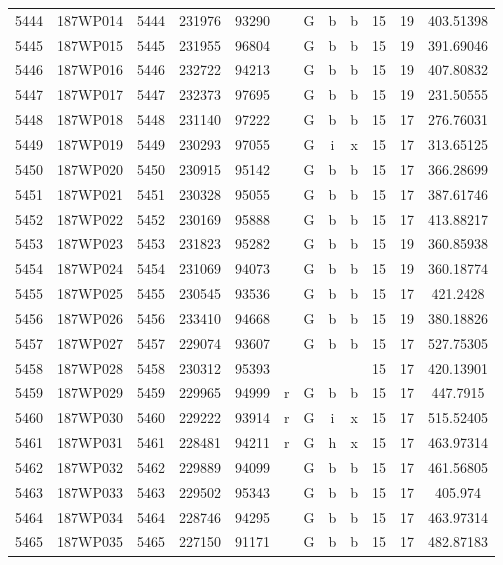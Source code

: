\begin{tabular}{|*{12}{c|}}
5444 & 187WP014 & 5444 & 231976 & 93290 &  & G & b & b & 15 & 19 & 403.51398 \\ 
5445 & 187WP015 & 5445 & 231955 & 96804 &  & G & b & b & 15 & 19 & 391.69046 \\ 
5446 & 187WP016 & 5446 & 232722 & 94213 &  & G & b & b & 15 & 19 & 407.80832 \\ 
5447 & 187WP017 & 5447 & 232373 & 97695 &  & G & b & b & 15 & 19 & 231.50555 \\ 
5448 & 187WP018 & 5448 & 231140 & 97222 &  & G & b & b & 15 & 17 & 276.76031 \\ 
5449 & 187WP019 & 5449 & 230293 & 97055 &  & G & i & x & 15 & 17 & 313.65125 \\ 
5450 & 187WP020 & 5450 & 230915 & 95142 &  & G & b & b & 15 & 17 & 366.28699 \\ 
5451 & 187WP021 & 5451 & 230328 & 95055 &  & G & b & b & 15 & 17 & 387.61746 \\ 
5452 & 187WP022 & 5452 & 230169 & 95888 &  & G & b & b & 15 & 17 & 413.88217 \\ 
5453 & 187WP023 & 5453 & 231823 & 95282 &  & G & b & b & 15 & 19 & 360.85938 \\ 
5454 & 187WP024 & 5454 & 231069 & 94073 &  & G & b & b & 15 & 19 & 360.18774 \\ 
5455 & 187WP025 & 5455 & 230545 & 93536 &  & G & b & b & 15 & 17 & 421.2428 \\ 
5456 & 187WP026 & 5456 & 233410 & 94668 &  & G & b & b & 15 & 19 & 380.18826 \\ 
5457 & 187WP027 & 5457 & 229074 & 93607 &  & G & b & b & 15 & 17 & 527.75305 \\ 
5458 & 187WP028 & 5458 & 230312 & 95393 &  &  &  &  & 15 & 17 & 420.13901 \\ 
5459 & 187WP029 & 5459 & 229965 & 94999 & r & G & b & b & 15 & 17 & 447.7915 \\ 
5460 & 187WP030 & 5460 & 229222 & 93914 & r & G & i & x & 15 & 17 & 515.52405 \\ 
5461 & 187WP031 & 5461 & 228481 & 94211 & r & G & h & x & 15 & 17 & 463.97314 \\ 
5462 & 187WP032 & 5462 & 229889 & 94099 &  & G & b & b & 15 & 17 & 461.56805 \\ 
5463 & 187WP033 & 5463 & 229502 & 95343 &  & G & b & b & 15 & 17 & 405.974 \\ 
5464 & 187WP034 & 5464 & 228746 & 94295 &  & G & b & b & 15 & 17 & 463.97314 \\ 
5465 & 187WP035 & 5465 & 227150 & 91171 &  & G & b & b & 15 & 17 & 482.87183 \\ 

\end{tabular}
